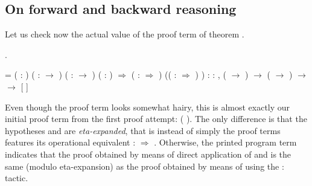 \subsection{On forward and backward reasoning}




Let us check now the actual value of the proof term of theorem
. 


\begin{coqdoccode}
\coqdocemptyline
\coqdocnoindent
{} .\coqdoceol
\end{coqdoccode}


\coqdoceol
\coqdocemptyline
\coqdocnoindent
{} = \coqdoceol
\coqdocindent{1.00em}
 (   : ) ( :  \ensuremath{\rightarrow} ) ( :  \ensuremath{\rightarrow} ) ( : ) \ensuremath{\Rightarrow}\coqdoceol
\coqdocindent{1.00em}
(  :  \ensuremath{\Rightarrow}  ) ((  :  \ensuremath{\Rightarrow}  ) )\coqdoceol
\coqdocindent{3.50em}
: \coqdockw{\ensuremath{\forall}}    : , ( \ensuremath{\rightarrow} ) \ensuremath{\rightarrow} ( \ensuremath{\rightarrow} ) \ensuremath{\rightarrow}  \ensuremath{\rightarrow} \coqdoceol
\coqdocnoindent
\coqdoceol
\coqdocnoindent
{}   [   \coqdocvar{\_} \coqdocvar{\_} \coqdocvar{\_}]

\coqdocemptyline


Even though the proof term looks somewhat hairy, this is almost
exactly our initial proof term from the first proof attempt:  (
). The only difference is that the hypotheses  and  are
\textit{eta-expanded}, that is instead of simply 
the proof terms features its operational equivalent  :  \ensuremath{\Rightarrow} 
. Otherwise, the printed program term indicates that the proof
obtained by means of direct application of  and  is the same
(modulo eta-expansion) as the proof obtained by means of using the
: tactic.


